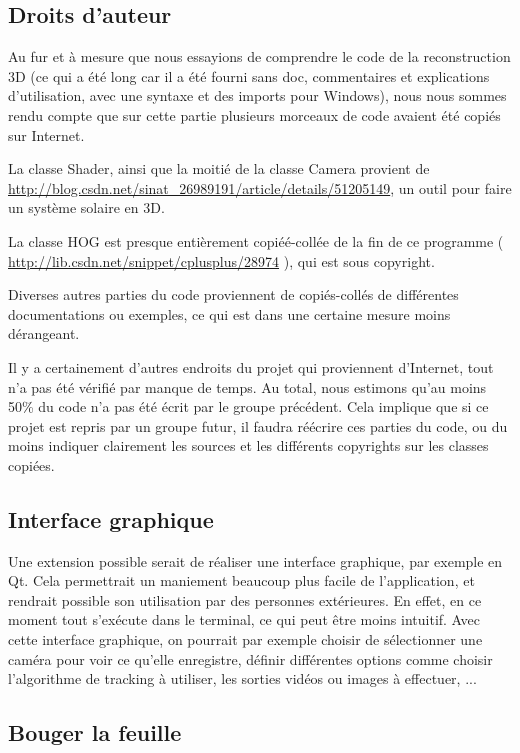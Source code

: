 \subsection{Droits d'auteur}
Au fur et à mesure que nous essayions de comprendre le code de la reconstruction 3D (ce qui a été long car il a été fourni sans doc, commentaires et explications d'utilisation, avec une syntaxe et des imports pour Windows), nous nous sommes rendu compte que sur cette partie plusieurs morceaux de code avaient été copiés sur Internet.

La classe Shader, ainsi que la moitié de la classe Camera provient de \url{http://blog.csdn.net/sinat_26989191/article/details/51205149}, un outil pour faire un système solaire en 3D.

La classe HOG est presque entièrement copiéé-collée de la fin de ce programme ( \url{http://lib.csdn.net/snippet/cplusplus/28974} ), qui est sous copyright.

Diverses autres parties du code proviennent de copiés-collés de différentes documentations ou exemples, ce qui est dans une certaine mesure moins dé\-ran\-geant.

Il y a certainement d'autres endroits du projet qui proviennent d'Internet, tout n'a pas été vérifié par manque de temps. Au total, nous estimons qu'au moins 50\% du code n'a pas été écrit par le groupe précédent. Cela implique que si ce projet est repris par un groupe futur, il faudra réécrire ces parties du code, ou du moins indiquer clairement les sources et les différents copyrights sur les classes copiées.

\subsection{Interface graphique}

Une extension possible serait de réaliser une interface graphique, par exemple en Qt. Cela permettrait un maniement beaucoup plus facile de l'application, et rendrait possible son utilisation par des personnes extérieures. En effet, en ce moment tout s'exécute dans le terminal, ce qui peut être moins intuitif. Avec cette interface graphique, on pourrait par exemple choisir de sélectionner une caméra pour voir ce qu'elle enregistre, définir différentes options comme choisir l'algorithme de tracking à utiliser, les sorties vidéos ou images à effectuer, ...

\subsection{Bouger la feuille}

